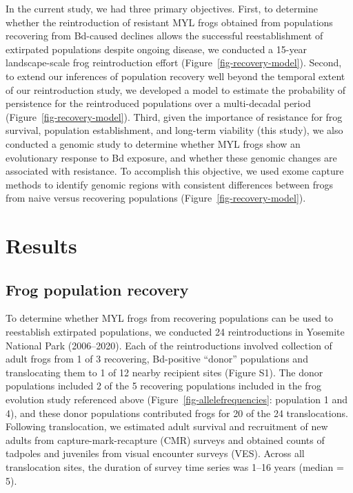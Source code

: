 \documentclass[9pt,twocolumn,twoside,lineno]{pnas-new}
\begin{document}
In the current study, we had three primary objectives. First, to
determine whether the reintroduction of resistant MYL frogs obtained
from populations recovering from Bd-caused declines allows the
successful reestablishment of extirpated populations despite ongoing
disease, we conducted a 15-year landscape-scale frog reintroduction
effort (Figure~\ref{fig-recovery-model}). Second, to extend our
inferences of population recovery well beyond the temporal extent of our
reintroduction study, we developed a model to estimate the probability
of persistence for the reintroduced populations over a multi-decadal
period (Figure~\ref{fig-recovery-model}). Third, given the importance of
resistance for frog survival, population establishment, and long-term
viability (this study), we also conducted a genomic study to determine
whether MYL frogs show an evolutionary response to Bd exposure, and
whether these genomic changes are associated with resistance. To
accomplish this objective, we used exome capture methods to identify
genomic regions with consistent differences between frogs from naive
versus recovering populations (Figure~\ref{fig-recovery-model}).

\section*{Results}

\subsection*{Frog population recovery}

To determine whether MYL frogs from recovering populations can be used
to reestablish extirpated populations, we conducted 24 reintroductions
in Yosemite National Park (2006--2020). Each of the reintroductions
involved collection of adult frogs from 1 of 3 recovering, Bd-positive
``donor'' populations and translocating them to 1 of 12 nearby recipient
sites (Figure S1). The donor populations included 2 of
the 5 recovering populations included in the frog evolution study
referenced above (Figure~\ref{fig-allelefrequencies}: population 1 and
4), and these donor populations contributed frogs for 20 of the 24
translocations. Following translocation, we estimated adult survival and
recruitment of new adults from capture-mark-recapture (CMR) surveys and
obtained counts of tadpoles and juveniles from visual encounter surveys
(VES). Across all translocation sites, the duration of survey time
series was 1--16 years (median = 5).
\end{document}
